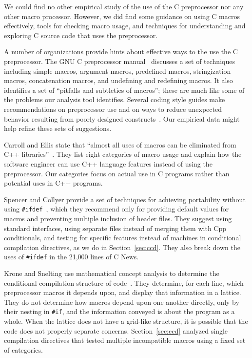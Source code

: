 \documentclass[10pt]{article}
\begin{document}
We could find no other empirical study of the use of the C preprocessor
nor any other macro processor.  However, we did find some guidance on
using C macros effectively, tools for checking macro usage, and
techniques for understanding and exploring C source code that uses the
preprocessor.

A number of organizations provide hints about effective ways to the use the
C preprocessor.  The GNU C preprocessor manual~\cite{cpp-manual} discusses
a set of techniques including simple macros, argument macros, predefined
macros, stringization macros, concatenation macros, and undefining and
redefining macros.  It also identifies a set of ``pitfalls and subtleties
of macros''; these are much like some of the problems our analysis tool
identifies.  Several coding style guides make recommendations on
preprocessor use and on ways to reduce unexpected behavior resulting from
poorly designed constructs~\cite{Stallman97,ellemtel92,Cannon95,Dolenc90}.
Our empirical data might help refine these sets of suggestions.

Carroll and Ellis state that ``almost all uses of macros can be eliminated
from C++ libraries''~\cite[p.~146]{Carroll95}.  They list eight categories
of macro usage and explain how the software engineer can use C++ language
features instead of using the preprocessor.  Our categories focus on actual
use in C programs rather than potential uses in C++ programs.

Spencer and Collyer provide a set of techniques for achieving portability
without using \texttt{\#ifdef}~\cite{SpencerC92}, which they recommend only
for providing default values for macros and preventing multiple inclusion
of header files.  They suggest using standard interfaces, using separate
files instead of merging them with Cpp conditionals, and testing for
specific features instead of machines in conditional compilation
directives, as we do in Section~\ref{sec:ccd}.  They also break down the
uses of \texttt{\#ifdef} in the 21,000 lines of C News.

Krone and Snelting use mathematical concept analysis to determine the
conditional compilation structure of code~\cite{Krone94}.  They determine,
for each line, which preprocessor macros it depends upon, and display that
information in a lattice.  They do not determine how macros depend upon one
another directly, only by their nesting in {\tt \#if}, and the information
conveyed is about the program as a whole.  When the lattice does not have a
grid-like structure, it is possible that the code does not properly
separate concerns.  Section~\ref{sec:ccd} analyzed single compilation
directives that tested multiple incompatible macros using a fixed set of
categories.
\end{document}

